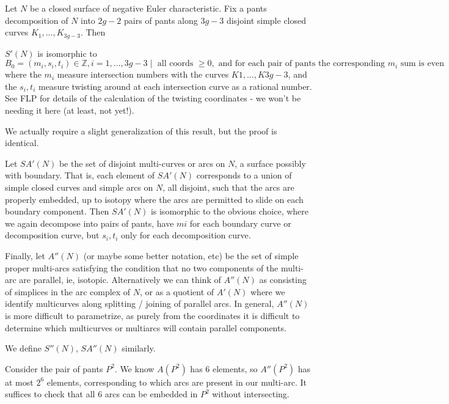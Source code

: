 {\begin{thm}[FLP 4.8]
Let $N$ be a closed surface of negative Euler characteristic.  Fix a pants
decomposition of $N$ into $2g-2$ pairs of pants along $3g-3$ disjoint simple
closed curves $K_1,...,K_{3g-3}$. Then

$S'(N)$ is isomorphic to $B_0 = {(m_i,s_i,t_i) \in \mathbb{Z}, i = 1,...,3g-3
\mid \text{ all coords }\geq 0, \text{ and for each pair of pants the
corresponding }m_i \text{ sum is even}}$ where the $m_i$ measure intersection
numbers with the curves $K1,...,K3g-3$, and the $s_i,t_i$ measure twisting
around at each intersection curve as a rational number.  See FLP for details of
the calculation of the twisting coordinates - we won't be needing it here (at
least, not yet!).

\end{thm}

We actually require a slight generalization of this result, but the proof is
identical.

\begin{thm}

Let $SA'(N)$ be the set of disjoint multi-curves or arcs on $N$, a surface
possibly with boundary. That is, each element of $SA'(N)$ corresponds to
a union of simple closed curves and simple arcs on $N$, all disjoint, such that
the arcs are properly embedded, up to isotopy where the arcs are permitted to
slide on each boundary component. Then $SA'(N)$ is isomorphic to the obvious
choice, where we again decompose into pairs of pants, have $mi$ for each
boundary curve or decomposition curve, but $s_i,t_i$ only for each
decomposition curve.

\end{thm}

Finally, let $A''(N)$ (or maybe some better notation, etc) be the set of simple
proper multi-arcs satisfying the condition that no two components of the
multi-arc are parallel, ie, isotopic. Alternatively we can think of $A''(N)$ as
consisting of simplices in the arc complex of $N$, or as a quotient of $A'(N)$
where we identify multicurves along splitting / joining of parallel arcs. In
general, $A''(N)$ is more difficult to parametrize, as purely from the
coordinates it is difficult to determine which multicurves or multiarcs will
contain parallel components.

We define $S''(N)$, $SA''(N)$ similarly.

\begin{example}

Consider the pair of pants $P^2$. We know $A(P^2)$ has 6 elements, so
$A''(P^2)$ has at most $2^6$ elements, corresponding to which arcs are present
in our multi-arc. It suffices to check that all 6 arcs can be embedded in $P^2$
without intersecting.


\end{example}}
